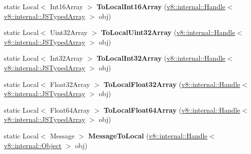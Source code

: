 \begin{DoxyCompactItemize}
\item 
\hypertarget{classv8_1_1_utils_ac87df11d66de4fdcfed5b558d4d566c0}{}static Local$<$ Int16\+Array $>$ {\bfseries To\+Local\+Int16\+Array} (\hyperlink{classv8_1_1internal_1_1_handle}{v8\+::internal\+::\+Handle}$<$ \hyperlink{classv8_1_1internal_1_1_j_s_typed_array}{v8\+::internal\+::\+J\+S\+Typed\+Array} $>$ obj)\label{classv8_1_1_utils_ac87df11d66de4fdcfed5b558d4d566c0}

\item 
\hypertarget{classv8_1_1_utils_a3ed505929d16003bffd8a4dd0948ad77}{}static Local$<$ Uint32\+Array $>$ {\bfseries To\+Local\+Uint32\+Array} (\hyperlink{classv8_1_1internal_1_1_handle}{v8\+::internal\+::\+Handle}$<$ \hyperlink{classv8_1_1internal_1_1_j_s_typed_array}{v8\+::internal\+::\+J\+S\+Typed\+Array} $>$ obj)\label{classv8_1_1_utils_a3ed505929d16003bffd8a4dd0948ad77}

\item 
\hypertarget{classv8_1_1_utils_aa13bae209ba10a9e6b268ead01e12c52}{}static Local$<$ Int32\+Array $>$ {\bfseries To\+Local\+Int32\+Array} (\hyperlink{classv8_1_1internal_1_1_handle}{v8\+::internal\+::\+Handle}$<$ \hyperlink{classv8_1_1internal_1_1_j_s_typed_array}{v8\+::internal\+::\+J\+S\+Typed\+Array} $>$ obj)\label{classv8_1_1_utils_aa13bae209ba10a9e6b268ead01e12c52}

\item 
\hypertarget{classv8_1_1_utils_a1707f254807f184579ce09e9f544d2d2}{}static Local$<$ Float32\+Array $>$ {\bfseries To\+Local\+Float32\+Array} (\hyperlink{classv8_1_1internal_1_1_handle}{v8\+::internal\+::\+Handle}$<$ \hyperlink{classv8_1_1internal_1_1_j_s_typed_array}{v8\+::internal\+::\+J\+S\+Typed\+Array} $>$ obj)\label{classv8_1_1_utils_a1707f254807f184579ce09e9f544d2d2}

\item 
\hypertarget{classv8_1_1_utils_a64bca553c7a7e8dd818e10c937ba0f22}{}static Local$<$ Float64\+Array $>$ {\bfseries To\+Local\+Float64\+Array} (\hyperlink{classv8_1_1internal_1_1_handle}{v8\+::internal\+::\+Handle}$<$ \hyperlink{classv8_1_1internal_1_1_j_s_typed_array}{v8\+::internal\+::\+J\+S\+Typed\+Array} $>$ obj)\label{classv8_1_1_utils_a64bca553c7a7e8dd818e10c937ba0f22}

\item 
\hypertarget{classv8_1_1_utils_abb489951956cbf3fa09c36322a2377f3}{}static Local$<$ Message $>$ {\bfseries Message\+To\+Local} (\hyperlink{classv8_1_1internal_1_1_handle}{v8\+::internal\+::\+Handle}$<$ \hyperlink{classv8_1_1internal_1_1_object}{v8\+::internal\+::\+Object} $>$ obj)\label{classv8_1_1_utils_abb489951956cbf3fa09c36322a2377f3}


\end{DoxyCompactItemize}
